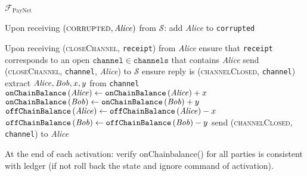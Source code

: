 \begin{functionality}{$\mathcal{F}_{\mathrm{PayNet}}$}
\begin{algorithmic}[1]
    \State Upon receiving $\left(\textsc{corrupted}, \mathit{Alice}\right)$ from
    $\mathcal{S}$:
    \Indent
      \State add \textit{Alice} to \texttt{corrupted}
    \EndIndent
    \State

    \State Upon receiving (\textsc{closeChannel}, \texttt{receipt}) from \textit{Alice} 
    \Indent
      \State ensure that \texttt{receipt} corresponds to an open
      $\mathtt{channel} \in \mathtt{channels}$ that contains \textit{Alice}
      \State send (\textsc{closeChannel}, \texttt{channel}, \textit{Alice}) to
      $\mathcal{S}$
      \State ensure reply is (\textsc{channelClosed}, \texttt{channel})
      \State extract $\mathit{Alice}, \mathit{Bob}, x, y$ from \texttt{channel}
      \State $\mathtt{onChainBalance}\left(\mathit{Alice}\right) \gets
      \mathtt{onChainBalance}\left(\mathit{Alice}\right) + x$
      \State {}
      \State $\mathtt{onChainBalance}\left(\mathit{Bob}\right) \gets
      \mathtt{onChainBalance}\left(\mathit{Bob}\right) + y$
      \State $\mathtt{offChainBalance}\left(\mathit{Alice}\right) \gets
      \mathtt{offChainBalance}\left(\mathit{Alice}\right) - x$
      \State $\mathtt{offChainBalance}\left(\mathit{Bob}\right) \gets
      \mathtt{offChainBalance}\left(\mathit{Bob}\right) - y$
      \State send (\textsc{channelClosed}, \texttt{channel}) to \textit{Alice}
    \EndIndent
    \State

    \State At the end of each activation: 
    \Indent
    \State verify  onChainbalance() for all parties is consistent with ledger (if not roll back the state and ignore command of activation).
    \EndIndent
  \end{algorithmic}
\end{functionality}
